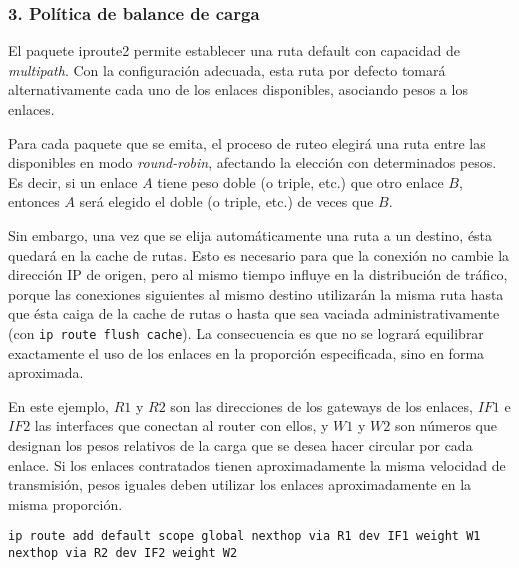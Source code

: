 \subsubsection{3. Política de balance de carga}
El paquete iproute2 permite establecer una ruta default con capacidad de \textit{multipath}. Con la configuración adecuada, esta ruta por defecto tomará alternativamente cada uno de los enlaces disponibles, asociando pesos a los enlaces. 

Para cada paquete que se emita, el proceso de ruteo elegirá una ruta entre las disponibles en modo \textit{round-robin}, afectando la elección con determinados pesos. Es decir, si un enlace $A$ tiene peso doble (o triple, etc.) que otro enlace $B$, entonces $A$ será elegido el doble (o triple, etc.) de veces que $B$. 

Sin embargo, una vez que se elija automáticamente una ruta a un destino, ésta quedará en la cache de rutas. Esto es necesario para que la conexión no cambie la dirección IP de origen, pero al mismo tiempo influye en la distribución de tráfico, porque las conexiones siguientes al mismo destino utilizarán la misma ruta hasta que ésta caiga de la cache de rutas o hasta que sea vaciada administrativamente (con \texttt{ip route flush cache}). La consecuencia es que no se logrará equilibrar exactamente el uso de los enlaces en la proporción especificada, sino en forma aproximada. 
  
En este ejemplo, $R1$ y $R2$ son las direcciones de los gateways de los enlaces, $IF1$ e $IF2$ las interfaces que conectan al router con ellos, y $W1$ y $W2$ son números que designan los pesos relativos de la carga que se desea hacer circular por cada enlace. Si los enlaces contratados tienen aproximadamente la misma velocidad de transmisión, pesos iguales deben utilizar los enlaces aproximadamente en la misma proporción.


\begin{lstlisting}
ip route add default scope global nexthop via R1 dev IF1 weight W1 nexthop via R2 dev IF2 weight W2
\end{lstlisting}


% 
% 

